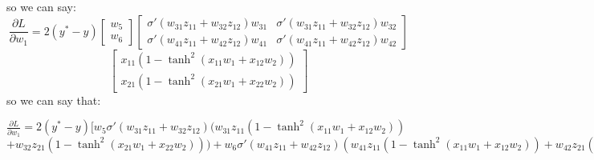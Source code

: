 \begin{qsolve}
\begin{qsolve}[]
        so we can say:
        $$\frac{\partial L}{\partial w_1} = 2(y^* - y) \begin{bmatrix}
        w_5\\
        w_6
        \end{bmatrix} \begin{bmatrix}
        \sigma'(w_{31}z_{11} + w_{32}z_{12})w_{31} & \sigma'(w_{31}z_{11} + w_{32}z_{12})w_{32}\\
        \sigma'(w_{41}z_{11} + w_{42}z_{12})w_{41} & \sigma'(w_{41}z_{11} + w_{42}z_{12})w_{42}
        \end{bmatrix}$$
        $$ \begin{bmatrix}
        x_{11}(1 - \tanh^2(x_{11}w_1 + x_{12}w_2))\\
        x_{21}(1 - \tanh^2(x_{21}w_1 + x_{22}w_2))
        \end{bmatrix}$$
        so we can say that:
        \begin{center}
            $\frac{\partial L}{\partial w_1} = 2(y^* - y)[w_5 \sigma'(w_{31}z_{11}+w_{32}z_{12})(w_{31} z_{11}(1 - \tanh^2(x_{11} w_1 + x_{12} w_2))$
            $ + w_{32} z_{21}(1 - \tanh^2(x_{21} w_1 + x_{22} w_2))) + w_6 \sigma'(w_{41}z_{11}+w_{42}z_{12})(w_{41} z_{11}(1 - \tanh^2(x_{11} w_1 + x_{12} w_2)) + w_{42} z_{21}(1 - \tanh^2(x_{21} w_1 + x_{22} w_2))) ]$
        \end{center}
    \end{qsolve}
\end{qsolve}